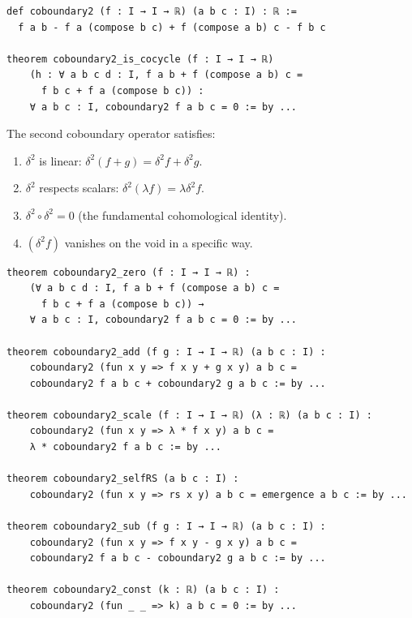 \begin{lstlisting}[caption={Second coboundary operator (IDT\_v3\_Emergence.lean)}]
def coboundary2 (f : I → I → ℝ) (a b c : I) : ℝ :=
  f a b - f a (compose b c) + f (compose a b) c - f b c

theorem coboundary2_is_cocycle (f : I → I → ℝ)
    (h : ∀ a b c d : I, f a b + f (compose a b) c =
      f b c + f a (compose b c)) :
    ∀ a b c : I, coboundary2 f a b c = 0 := by ...
\end{lstlisting}

\begin{theorem}
\label{thm:coboundary2-properties}
The second coboundary operator satisfies:
\begin{enumerate}
  \item $\delta^2$ is linear: $\delta^2(f + g) = \delta^2 f + \delta^2 g$.
  \item $\delta^2$ respects scalars: $\delta^2(\lambda f) = \lambda \delta^2 f$.
  \item $\delta^2 \circ \delta^2 = 0$ (the fundamental cohomological identity).
  \item $(\delta^2 f)$ vanishes on the void in a specific way.
\end{enumerate}
\end{theorem}

\begin{lstlisting}[caption={Coboundary2 properties (IDT\_v3\_Emergence.lean)}]
theorem coboundary2_zero (f : I → I → ℝ) :
    (∀ a b c d : I, f a b + f (compose a b) c =
      f b c + f a (compose b c)) →
    ∀ a b c : I, coboundary2 f a b c = 0 := by ...

theorem coboundary2_add (f g : I → I → ℝ) (a b c : I) :
    coboundary2 (fun x y => f x y + g x y) a b c =
    coboundary2 f a b c + coboundary2 g a b c := by ...

theorem coboundary2_scale (f : I → I → ℝ) (λ : ℝ) (a b c : I) :
    coboundary2 (fun x y => λ * f x y) a b c =
    λ * coboundary2 f a b c := by ...

theorem coboundary2_selfRS (a b c : I) :
    coboundary2 (fun x y => rs x y) a b c = emergence a b c := by ...

theorem coboundary2_sub (f g : I → I → ℝ) (a b c : I) :
    coboundary2 (fun x y => f x y - g x y) a b c =
    coboundary2 f a b c - coboundary2 g a b c := by ...

theorem coboundary2_const (k : ℝ) (a b c : I) :
    coboundary2 (fun _ _ => k) a b c = 0 := by ...
\end{lstlisting}

